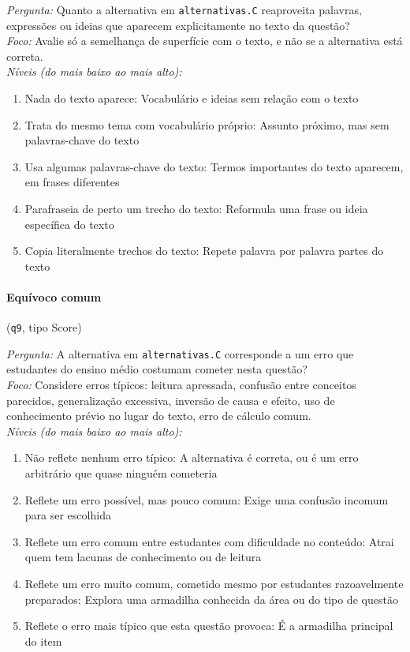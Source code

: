 \textit{Pergunta:} Quanto a alternativa em \texttt{alternativas.C} reaproveita palavras, expressões ou ideias que aparecem explicitamente no texto da questão?\\
\textit{Foco:} Avalie só a semelhança de superfície com o texto, e não se a alternativa está correta.\\
\textit{Níveis (do mais baixo ao mais alto):}
\begin{enumerate}[nosep,label=\arabic*.,start=0]
  \item Nada do texto aparece: Vocabulário e ideias sem relação com o texto
  \item Trata do mesmo tema com vocabulário próprio: Assunto próximo, mas sem palavras-chave do texto
  \item Usa algumas palavras-chave do texto: Termos importantes do texto aparecem, em frases diferentes
  \item Parafraseia de perto um trecho do texto: Reformula uma frase ou ideia específica do texto
  \item Copia literalmente trechos do texto: Repete palavra por palavra partes do texto
\end{enumerate}

\paragraph{Equívoco comum} (\texttt{q9}, tipo Score)

\textit{Pergunta:} A alternativa em \texttt{alternativas.C} corresponde a um erro que estudantes do ensino médio costumam cometer nesta questão?\\
\textit{Foco:} Considere erros típicos: leitura apressada, confusão entre conceitos parecidos, generalização excessiva, inversão de causa e efeito, uso de conhecimento prévio no lugar do texto, erro de cálculo comum.\\
\textit{Níveis (do mais baixo ao mais alto):}
\begin{enumerate}[nosep,label=\arabic*.,start=0]
  \item Não reflete nenhum erro típico: A alternativa é correta, ou é um erro arbitrário que quase ninguém cometeria
  \item Reflete um erro possível, mas pouco comum: Exige uma confusão incomum para ser escolhida
  \item Reflete um erro comum entre estudantes com dificuldade no conteúdo: Atrai quem tem lacunas de conhecimento ou de leitura
  \item Reflete um erro muito comum, cometido mesmo por estudantes razoavelmente preparados: Explora uma armadilha conhecida da área ou do tipo de questão
  \item Reflete o erro mais típico que esta questão provoca: É a armadilha principal do item
\end{enumerate}

